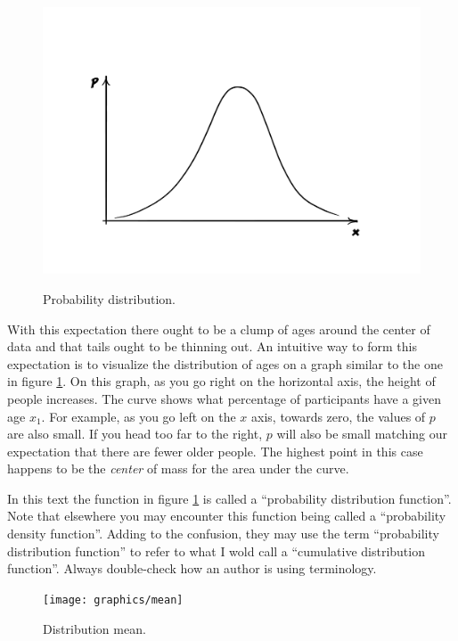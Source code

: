 \documentclass{tufte-book} %
\begin{document}
\begin{figure}
	\centering
	\includegraphics[trim={4cm 3cm 4cm 5cm},clip]{graphics/distribution}
	\label{img:distribution}
	\caption{Probability distribution.}
\end{figure}

With this expectation there ought to be a clump of ages around the center of data and that tails ought to be thinning out. An intuitive way to form this expectation is to visualize the distribution of ages on a graph similar to the one in figure \ref{img:distribution}. On this graph, as you go right on the horizontal axis, the height of people increases. The curve shows what percentage of participants have a given age $x_1$. For example, as you go left on the $x$ axis, towards zero, the values of $p$ are also small. If you head too far to the right, $p$ will also be small matching our expectation that there are fewer older people. The highest point in this case happens to be the {\em center} of mass for the area under the curve. 

\begin{tcolorbox}
	In this text the function in figure \ref{img:distribution} is called a ``probability distribution function''. Note that elsewhere you may encounter this function being called a ``probability density function''. Adding to the confusion, they may use the term ``probability distribution function'' to refer to what I wold call a ``cumulative distribution function''. Always double-check how an author is using terminology.
\end{tcolorbox}

\begin{figure}
	\centering
	\texttt{[image: graphics/mean]}
	\label{img:mean}
	\caption{Distribution mean.}
\end{figure}
\end{document}
